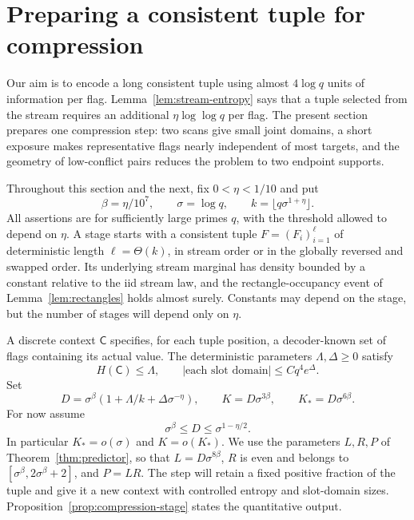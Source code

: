 \section{Preparing a consistent tuple for compression}
\label{sec:compression-local}

Our aim is to encode a long consistent tuple using almost $4\log q$ units
of information per flag.  Lemma~\ref{lem:stream-entropy} says that a tuple
selected from the stream requires an additional $\eta\log\log q$ per flag.
The present section prepares one compression step: two scans give small
joint domains, a short exposure makes representative flags nearly
independent of most targets, and the geometry of low-conflict pairs
reduces the problem to two endpoint supports.

Throughout this section and the next, fix $0<\eta<1/10$ and put
\[
 \beta=\eta/10^7,\qquad \sigma=\log q,\qquad
 k=\lfloor q\sigma^{1+\eta}\rfloor.
\]
All assertions are for sufficiently large primes $q$, with the threshold
allowed to depend on $\eta$.  A stage starts with a consistent tuple
$F=(F_i)_{i=1}^{\ell}$ of deterministic length $\ell=\Theta(k)$, in stream
order or in the globally reversed and swapped order.  Its underlying
stream marginal has density bounded by a constant relative to the iid
stream law, and the rectangle-occupancy event of
Lemma~\ref{lem:rectangles} holds almost surely.  Constants may depend on the stage, but the number of stages
will depend only on $\eta$.

A discrete context $\mathsf C$ specifies, for each tuple position, a
decoder-known set of flags containing its actual value.  The deterministic
parameters $\Lambda,\Delta\ge0$ satisfy
\begin{equation}\label{eq:stage-input}
 H(\mathsf C)\le\Lambda,\qquad
 |\text{each slot domain}|\le Cq^4e^\Delta.
\end{equation}
Set
\begin{equation}\label{eq:stage-parameters}
 D=\sigma^\beta(1+\Lambda/k+\Delta\sigma^{-\eta}),\qquad
 K=D\sigma^{3\beta},\qquad K_*=D\sigma^{6\beta}.
\end{equation}
For now assume
\begin{equation}\label{eq:stage-range}
 \sigma^\beta\le D\le\sigma^{1-\eta/2}.
\end{equation}
In particular $K_*=o(\sigma)$ and $K=o(K_*)$.  We use the parameters
$L,R,P$ of Theorem~\ref{thm:predictor}, so that
$L=D\sigma^{8\beta}$, $R$ is even and belongs to
$[\sigma^\beta,2\sigma^\beta+2]$, and $P=LR$.
The step will retain a fixed positive fraction of the tuple and give it
a new context with controlled entropy and slot-domain sizes.
Proposition~\ref{prop:compression-stage} states the quantitative output.

